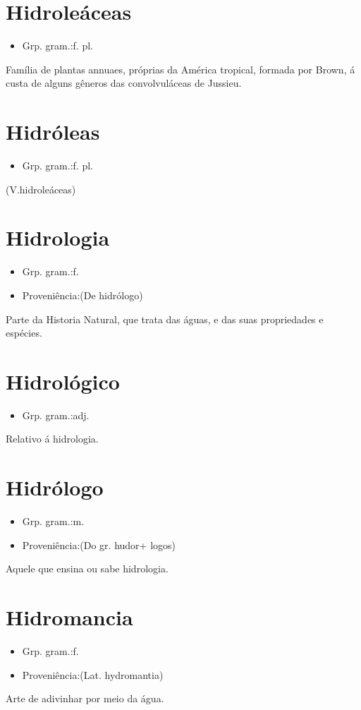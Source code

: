 \documentclass{article}
\begin{document}
\section{Hidroleáceas}
\begin{itemize}
\item {Grp. gram.:f. pl.}
\end{itemize}
Família de plantas annuaes, próprias da América tropical, formada por Brown, á custa de alguns gêneros das convolvuláceas de Jussieu.
\section{Hidróleas}
\begin{itemize}
\item {Grp. gram.:f. pl.}
\end{itemize}
(V.hidroleáceas)
\section{Hidrologia}
\begin{itemize}
\item {Grp. gram.:f.}
\end{itemize}
\begin{itemize}
\item {Proveniência:(De \textunderscore hidrólogo\textunderscore )}
\end{itemize}
Parte da Historia Natural, que trata das águas, e das suas propriedades e espécies.
\section{Hidrológico}
\begin{itemize}
\item {Grp. gram.:adj.}
\end{itemize}
Relativo á hidrologia.
\section{Hidrólogo}
\begin{itemize}
\item {Grp. gram.:m.}
\end{itemize}
\begin{itemize}
\item {Proveniência:(Do gr. \textunderscore hudor\textunderscore  + \textunderscore logos\textunderscore )}
\end{itemize}
Aquele que ensina ou sabe hidrologia.
\section{Hidromancia}
\begin{itemize}
\item {Grp. gram.:f.}
\end{itemize}
\begin{itemize}
\item {Proveniência:(Lat. \textunderscore hydromantia\textunderscore )}
\end{itemize}
Arte de adivinhar por meio da água.
\end{document}
